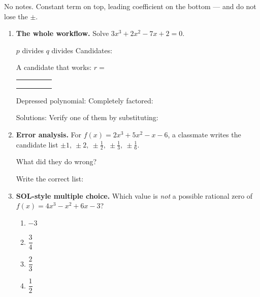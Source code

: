\documentclass[10pt]{article}
\begin{document}
\namedateperiod

\vspace{0.10in}

No notes. Constant term on top, leading coefficient on the bottom --- and do not lose the $\pm$.

\begin{enumerate}[leftmargin=1.8em, itemsep=11pt]
  \item \textbf{The whole workflow.} Solve $3x^3 + 2x^2 - 7x + 2 = 0$.

    \vspace{3pt}
    $p$ divides \blank{0.9cm} \quad $q$ divides \blank{0.9cm} \quad
    Candidates: \blank{6.0cm}

    \vspace{3pt}
    A candidate that works: $r = $ \blank{1.0cm}
    \begin{center}
    \renewcommand{\arraystretch}{1.6}
    \begin{tabular}{r|C{1.5cm}C{1.5cm}C{1.5cm}C{1.5cm}}
        &     &     &     &     \\
        &     &     &     &     \\ 
        &     &     &     &     \\
    \end{tabular}
    \end{center}

    \vspace{2pt}
    Depressed polynomial: \blank{3.0cm} \quad Completely factored: \blank{4.6cm}

    \vspace{3pt}
    Solutions: \blank{4.0cm} \quad Verify one of them by substituting: \blank{4.6cm}

  \item \textbf{Error analysis.} For $f(x) = 2x^3 + 5x^2 - x - 6$, a classmate writes the candidate
    list $\pm 1,\ \pm 2,\ \pm\tfrac12,\ \pm\tfrac13,\ \pm\tfrac16$.

    \vspace{3pt}
    What did they do wrong? \blank{6.4cm}

    \vspace{3pt}
    Write the correct list: \blank{7.0cm}

  \item \textbf{SOL-style multiple choice.} Which value is \emph{not} a possible rational zero of
    $f(x) = 4x^3 - x^2 + 6x - 3$?
    \begin{enumerate}[label=\Alph*., leftmargin=1.9em, itemsep=1pt]
      \item $-3$
      \item $\dfrac{3}{4}$
      \item $\dfrac{2}{3}$
      \item $\dfrac{1}{2}$
    \end{enumerate}
\end{enumerate}
\end{document}
